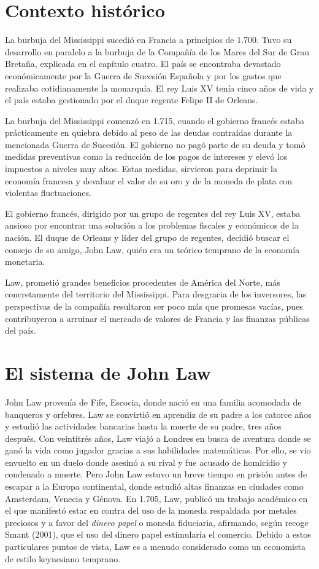 \section{Contexto histórico}
La burbuja del Mississippi sucedió en Francia a principios de 1.700. Tuvo su desarrollo en paralelo a la burbuja de la Compañía de los Mares del Sur de Gran Bretaña, explicada en el capítulo cuatro.
El país se encontraba devastado económicamente por la Guerra de Sucesión Española y por los gastos que realizaba cotidianamente la monarquía. El rey Luis XV tenía cinco años de vida y el país estaba gestionado por el duque regente Felipe II de Orleans. 

La burbuja del Mississippi comenzó en 1.715, cuando el gobierno francés estaba prácticamente en quiebra debido al peso de las deudas contraídas durante la mencionada Guerra de Sucesión. El gobierno no pagó parte de su deuda y tomó medidas preventivas como la reducción de los pagos de intereses y elevó los impuestos a niveles muy altos. Estas medidas, sirvieron para deprimir la economía francesa y devaluar el valor de su oro y de la moneda de plata con violentas fluctuaciones. 

El gobierno francés, dirigido por un grupo de regentes del rey Luis XV, estaba ansioso por encontrar una solución a los problemas fiscales y económicos de la nación. El duque de Orleans y líder del grupo de regentes, decidió buscar el consejo de su amigo, John Law, quién era un teórico temprano de la economía monetaria.

Law, prometió grandes beneficios procedentes de América del Norte, más concretamente del territorio del Mississippi. Para desgracia de los inversores, las perspectivas de la compañía resultaron ser poco más que promesas vacías, pues contribuyeron a arruinar el mercado de valores de Francia y las finanzas públicas del país.

\section{El sistema de John Law}

John Law provenía de Fife, Escocia, donde nació en una familia acomodada de banqueros y orfebres. Law se convirtió en aprendiz de su padre a los catorce años y estudió las actividades bancarias hasta la muerte de su padre, tres años después. Con veintitrés años, Law viajó a Londres en busca de aventura donde se ganó la vida como jugador gracias a sus habilidades matemáticas. Por ello, se vio envuelto en un duelo donde asesinó a su rival y fue acusado de homicidio y condenado a muerte. Pero John Law estuvo un breve tiempo en prisión antes de escapar a la Europa continental, donde estudió altas finanzas en ciudades como Amsterdam, Venecia y Génova. En 1.705, Law, publicó un trabajo académico en el que manifestó estar en contra del uso de la moneda respaldada por metales preciosos y a favor del \emph{dinero papel} o moneda fiduciaria, afirmando, según recoge Smant (2001), que el uso del dinero papel estimularía el comercio. Debido a estos particulares puntos de vista, Law es a menudo considerado como un economista de estilo keynesiano temprano. 

